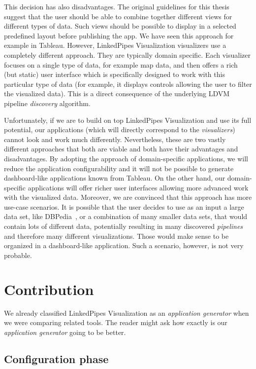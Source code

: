 This decision has also disadvantages. The original guidelines for this thesis suggest that the user should be able to combine together different views for different types of data. Such views should be possible to display in a selected predefined layout before publishing the app. We have seen this approach for example in Tableau. However, LinkedPipes Visualization visualizers use a completely different approach. They are typically domain specific. Each visualizer focuses on a single type of data, for example map data, and then offers a rich (but static) user interface which is specifically designed to work with this particular type of data (for example, it displays controls allowing the user to filter the visualized data). This is a direct consequence of the underlying LDVM pipeline \emph{discovery} algorithm.

Unfortunately, if we are to build on top LinkedPipes Visualization and use its full potential, our applications (which will directly correspond to the \emph{visualizers}) cannot look and work much differently. Nevertheless, these are two vastly different approaches that both are viable and both have their advantages and disadvantages. By adopting the approach of domain-specific applications, we will reduce the application configurability and it will not be possible to generate dashboard-like applications known from Tableau. On the other hand, our domain-specific applications will offer richer user interfaces allowing more advanced work with the visualized data. Moreover, we are convinced that this approach has more use-case scenarios. It is possible that the user decides to use as an input a large data set, like DBPedia~\cite{dbpedia}, or a combination of many smaller data sets, that would contain lots of different data, potentially resulting in many discovered \emph{pipelines} and therefore many different visualizations. Those would make sense to be organized in a dashboard-like application. Such a scenario, however, is not very probable.

\section{Contribution}
\label{sec:system_proposal:contribution}

We already classified LinkedPipes Visualization as an \emph{application generator} when we were comparing related tools. The reader might ask how exactly is our \emph{application generator} going to be better. 

\subsection{Configuration phase}


